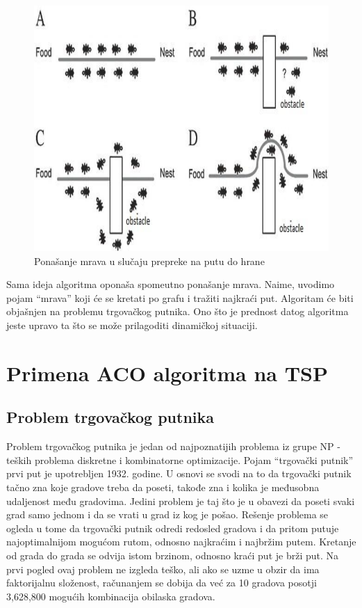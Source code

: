 \documentclass[a4paper]{article}
\begin{document}
{\begin{figure}[h!]
\begin{center}
\includegraphics[scale=0.3]{aco_obstacle.png}
\end{center}
\caption{Ponašanje mrava u slučaju prepreke na putu do hrane}
\label{fig:mravi}
\end{figure}

Sama ideja algoritma oponaša spomeutno ponašanje mrava. Naime, uvodimo pojam ``mrava'' koji će se kretati po grafu i tražiti najkraći put. Algoritam će biti objašnjen na problemu trgovačkog putnika. Ono što je prednost datog algoritma jeste upravo ta što se može prilagoditi dinamičkoj situaciji.

\section{Primena ACO algoritma na TSP}
\label{acotsp}

\subsection{Problem trgovačkog putnika}
\label{subsec:podnaslov1}

Problem trgovačkog putnika je jedan od najpoznatijih problema iz grupe NP - teških problema diskretne i kombinatorne optimizacije. Pojam ``trgovački putnik'' prvi put je upotrebljen 1932. godine. U osnovi se svodi na to da trgovački putnik tačno zna koje gradove treba da poseti, takođe zna i kolika je međusobna udaljenost među gradovima. Jedini problem je taj što je u obavezi da poseti svaki grad samo jednom i da se vrati u grad iz kog je pošao. Rešenje problema se ogleda u tome da trgovački putnik odredi redosled gradova i da pritom putuje najoptimalnijom mogućom rutom, odnosno najkraćim i najbržim putem. Kretanje od grada do grada se odvija istom brzinom, odnosno kraći put je brži put. Na prvi pogled ovaj problem ne izgleda teško, ali ako se uzme u obzir da ima faktorijalnu složenost, računanjem se dobija da već za 10 gradova posotji 3,628,800 mogućih kombinacija obilaska gradova.

}
\end{document}
